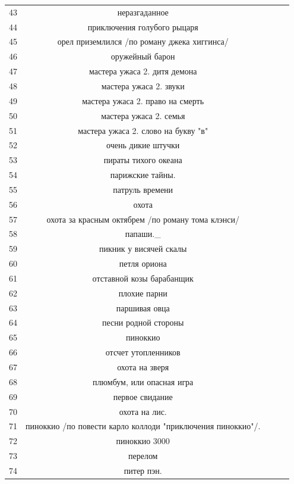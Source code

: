 \documentclass[12pt]{report}
\begin{document}
\begin{table}[H]
	\label{tab:v6}
	\begin{center}

		\begin{tabular}{|c@{\hspace{7mm}}|c@{\hspace{7mm}}|c@{\hspace{7mm}}|c|c|}
		\hline
43 & неразгаданное \\
44 & приключения голубого рыцаря \\
45 & орел приземлился /по роману джека хиггинса/ \\
46 & оружейный барон \\
47 & мастера ужаса 2. дитя демона \\
48 & мастера ужаса 2. звуки \\
49 & мастера ужаса 2. право на смерть \\
50 & мастера ужаса 2. семья \\
51 & мастера ужаса 2. слово на букву "в" \\
52 & очень дикие штучки \\
53 & пираты тихого океана \\
54 & парижские тайны. \\
55 & патруль времени \\
56 & охота \\
57 & охота за красным октябрем /по роману тома клэнси/ \\
58 & папаши._ \\
59 & пикник у висячей скалы \\
60 & петля ориона \\
61 & отставной козы барабанщик \\
62 & плохие парни \\
63 & паршивая овца \\
64 & песни родной стороны \\
65 & пиноккио \\
66 & отсчет утопленников \\
67 & охота на зверя \\
68 & плюмбум, или опасная игра \\
69 & первое свидание \\
70 & охота на лис. \\
71 & пиноккио /по повести карло коллоди "приключения пиноккио"/. \\
72 & пиноккио 3000 \\
73 & перелом \\
74 & питер пэн. \\

\end{tabular}
\end{center}
\end{table}
\end{document}
